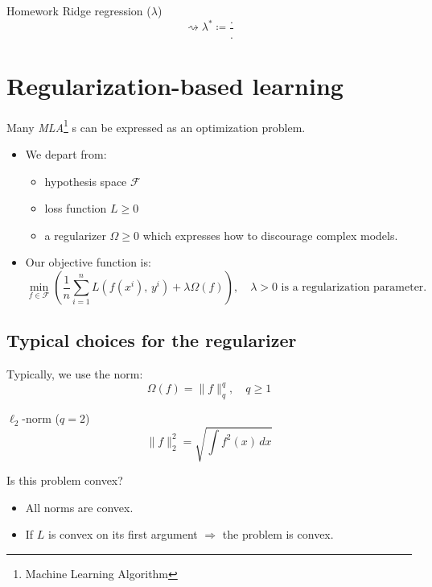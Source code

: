 \begin{exercise}{Homework}{}
Ridge regression ($\lambda$)
\begin{equation}
	\rightsquigarrow \lambda ^* \coloneqq \frac{.}{.}
\end{equation}
\end{exercise}

\section{Regularization-based learning} %
\label{sec:Regularization-based-learning}

Many \emph{MLA}\footnote{Machine Learning Algorithm}%
s can be expressed as an optimization problem.
\begin{itemize}
	\item We depart from:
	      \begin{itemize}
		      \item hypothesis space $\mathcal{F}$
		      \item loss function $L \geq 0$
		      \item a regularizer $\Omega \geq 0$ which expresses how to discourage complex models.
	      \end{itemize}
      \item Our objective function is:
\[
	\min_{f \in \mathcal{F}} \left(\frac{1}{n} \sum_{i=1}^n L\left(f(x^i),\, y^i\right) + \lambda\Omega(f) \right)
	, \quad \lambda > 0 \text{ is a regularization parameter.}
\]

\end{itemize}

\subsection{Typical choices for the regularizer} %

Typically, we use the norm:
\begin{equation*}
	\Omega(f) = \lVert f \rVert_q^q, \quad q \geq 1
\end{equation*}
\begin{example}{$\ell_2$-norm ($q = 2$)}{}
\begin{equation*}
	\lVert f \rVert_2^2 = \sqrt{\int f^2(x) \, dx}
\end{equation*}
\end{example}

\begin{question}{Is this problem convex?}{}
\begin{itemize}
	\item All norms are convex.
	\item If $L$ is convex on its first argument $\Rightarrow$ the problem is convex.
\end{itemize}
\end{question}

